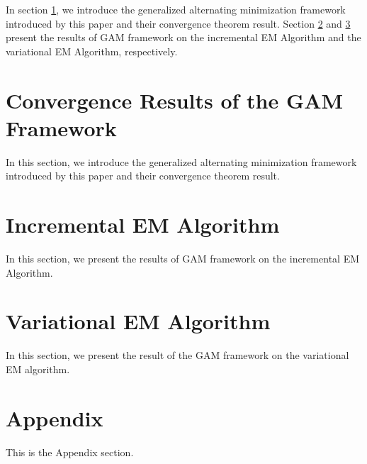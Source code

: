 \documentclass[11pt]{article}
\begin{document}
	In section \ref{gam}, we introduce the generalized alternating  minimization framework introduced by this paper and their convergence theorem result. Section \ref{incremental} and \ref{variational} present the results of GAM framework on the incremental EM Algorithm and the variational EM Algorithm, respectively.
	 
	\section{Convergence Results of the GAM Framework} \label{gam}
	In this section, we introduce the generalized alternating  minimization framework introduced by this paper and their convergence theorem result.
	\section{Incremental EM Algorithm} \label{incremental}
	In this section, we present the results of GAM framework on the incremental EM Algorithm. 
	
	\section{Variational EM Algorithm} \label{variational}
	In this section, we present the result of the GAM framework on the variational EM algorithm.
	
	\section*{Appendix}
	This is the Appendix section.
\end{document}
